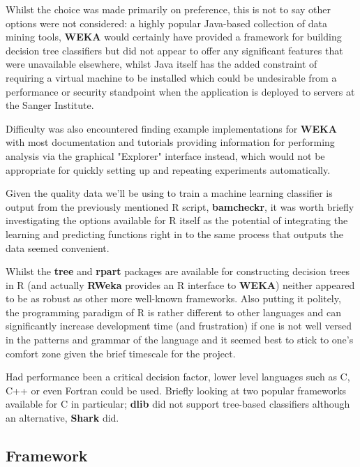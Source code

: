 Whilst the choice was made primarily on preference, this is not to say other
options were not considered: a highly popular Java-based collection of data
mining tools, \textbf{WEKA}\citep{weka} would certainly have provided a
framework for building decision tree classifiers but did not
appear to offer any significant features that were unavailable elsewhere, whilst
Java itself has the added constraint of requiring a virtual machine to be
installed which could be undesirable from a performance or security
standpoint when the application is deployed to servers at the Sanger Institute.


Difficulty was also encountered finding example implementations for \textbf{WEKA}
with most documentation and tutorials providing information for performing
analysis via the graphical "Explorer" interface instead, which would not be
appropriate for quickly setting up and repeating experiments automatically.

Given the quality data we'll be using to train a machine learning classifier is
output from the previously mentioned R script, \textbf{bamcheckr}, it was worth
briefly investigating the options available for R itself as the potential of
integrating the learning and predicting functions right in to the same process
that outputs the data seemed convenient.

Whilst the \textbf{tree}\citep{man:rtree} and \textbf{rpart}\citep{man:rpart}
packages are available for constructing decision trees in R (and actually
\textbf{RWeka} provides an R interface to \textbf{WEKA}) neither appeared to be
as robust as other more well-known frameworks. Also putting it politely, the
programming paradigm of R\citep{man:R} is rather different to other languages
and can significantly increase development time (and frustration\citep{argh}) if
one is not well versed in the patterns and grammar of the language  and it
seemed best to stick to one's comfort zone given the brief timescale for the
project.

Had performance been a critical decision factor, lower level languages such as
C, C++ or even Fortran could be used. Briefly looking at two popular frameworks
available for C in particular; \textbf{dlib} did not support tree-based
classifiers although an alternative, \textbf{Shark} did.


\subsection{Framework}

